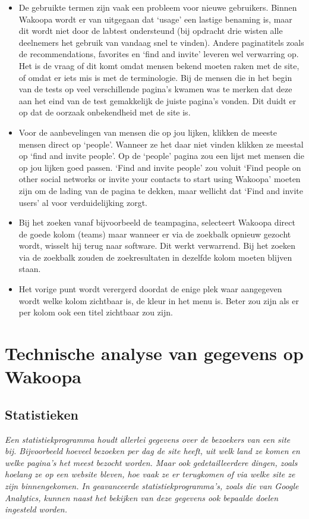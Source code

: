 \documentclass[a4paper, 10pt, pdftex]{report}
\begin{document}
      \begin{itemize}

        \item De gebruikte termen zijn vaak een probleem voor nieuwe gebruikers. Binnen Wakoopa wordt er van uitgegaan dat `usage' een lastige benaming is, maar dit wordt niet door de labtest ondersteund (bij opdracht drie wisten alle deelnemers het gebruik van vandaag snel te vinden). Andere paginatitels zoals de recommendations, favorites en `find and invite' leveren wel verwarring op. Het is de vraag of dit komt omdat mensen bekend moeten raken met de site, of omdat er iets mis is met de terminologie. Bij de mensen die in het begin van de tests op veel verschillende pagina's kwamen was te merken dat deze aan het eind van de test gemakkelijk de juiste pagina's vonden. Dit duidt er op dat de oorzaak onbekendheid met de site is.

        \item Voor de aanbevelingen van mensen die op jou lijken, klikken de meeste mensen direct op `people'. Wanneer ze het daar niet vinden klikken ze meestal op `find and invite people'. Op de `people' pagina zou een lijst met mensen die op jou lijken goed passen. `Find and invite people' zou voluit `Find people on other social networks or invite your contacts to start using Wakoopa' moeten zijn om de lading van de pagina te dekken, maar wellicht dat `Find and invite users' al voor verduidelijking zorgt.

        \item Bij het zoeken vanaf bijvoorbeeld de teampagina, selecteert Wakoopa direct de goede kolom (teams) maar wanneer er via de zoekbalk opnieuw gezocht wordt, wisselt hij terug naar software. Dit werkt verwarrend. Bij het zoeken via de zoekbalk zouden de zoekresultaten in dezelfde kolom moeten blijven staan.

        \item Het vorige punt wordt verergerd doordat de enige plek waar aangegeven wordt welke kolom zichtbaar is, de kleur in het menu is. Beter zou zijn als er per kolom ook een titel zichtbaar zou zijn.

      \end{itemize}

  \newpage
  \chapter{Technische analyse van gegevens op Wakoopa}
    \label{datachapter}
    \newpage
    \section{Statistieken}
    \textit{Een statistiekprogramma houdt allerlei gegevens over de bezoekers van een site bij. Bijvoorbeeld hoeveel bezoeken per dag de site heeft, uit welk land ze komen en welke pagina's het meest bezocht worden. Maar ook gedetailleerdere dingen, zoals hoelang ze op een website bleven, hoe vaak ze er terugkomen of via welke site ze zijn binnengekomen. In geavanceerde statistiekprogramma's, zoals die van Google Analytics, kunnen naast het bekijken van deze gegevens ook bepaalde doelen ingesteld worden.}
\end{document}
